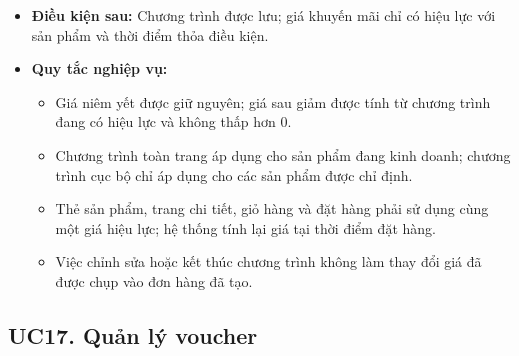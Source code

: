 \documentclass[12pt,a4paper]{article}
\begin{document}
\begin{itemize}
\begin{itemize}
  \item Nếu có nhiều chương trình cùng đủ điều kiện cho một sản phẩm, hệ thống chỉ áp dụng một chương trình có mức giảm lớn nhất; không cộng dồn các chương trình giảm giá sản phẩm.
 \end{itemize}
 \item \textbf{Điều kiện sau:} Chương trình được lưu; giá khuyến mãi chỉ có hiệu lực với sản phẩm và thời điểm thỏa điều kiện.
 \item \textbf{Quy tắc nghiệp vụ:}
 \begin{itemize}
  \item Giá niêm yết được giữ nguyên; giá sau giảm được tính từ chương trình đang có hiệu lực và không thấp hơn 0.
  \item Chương trình toàn trang áp dụng cho sản phẩm đang kinh doanh; chương trình cục bộ chỉ áp dụng cho các sản phẩm được chỉ định.
  \item Thẻ sản phẩm, trang chi tiết, giỏ hàng và đặt hàng phải sử dụng cùng một giá hiệu lực; hệ thống tính lại giá tại thời điểm đặt hàng.
  \item Việc chỉnh sửa hoặc kết thúc chương trình không làm thay đổi giá đã được chụp vào đơn hàng đã tạo.
 \end{itemize}
\end{itemize}


\subsection{UC17. Quản lý voucher}
\end{document}

